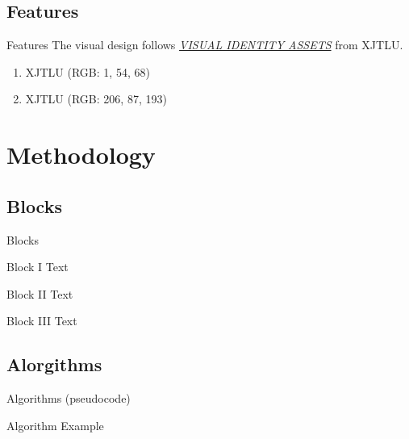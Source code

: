 \documentclass{libs/XJTLU_format}
\begin{document}
\subsection{Features}

\begin{frame}{Features}
	The visual design follows \href{https://www.xjtlu.edu.cn/en/about/professional-services/centre-for-knowledge-and-information/university-marketing-and-communications/visual-identity-assets}{\emph{VISUAL IDENTITY ASSETS}} from XJTLU.
    \begin{enumerate}
        \item {XJTLU  (RGB: 1, 54, 68)}
        \item {XJTLU  (RGB: 206, 87, 193)}
    \end{enumerate}
\end{frame}


\section{Methodology}

\subsection{Blocks}
\begin{frame}{Blocks}
    \begin{block}{Block I}
        Text
    \end{block}

    \begin{alertblock}{Block II}
        Text
    \end{alertblock}

    \begin{exampleblock}{Block III}
        Text
    \end{exampleblock}  
    
 
\end{frame}


\subsection{Alorgithms}
\begin{frame}{Algorithms (pseudocode)}
    \begin{algorithm}[H]
        \SetAlgoLined
        \LinesNumbered
         \caption{Algorithm Example}
    \end{algorithm}
\end{frame}
\end{document}
